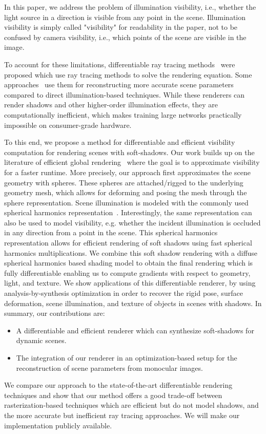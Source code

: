 %
In this paper, we address the problem of illumination visibility, i.e., whether the light source in a direction is visible from any point in the scene. 
%
Illumination visibility is simply called "visibility" for readability in the paper, not to be confused by camera visibility, i.e., which points of the scene are visible in the image.
%
%
%
\par 
%
To account for these limitations, differentiable ray tracing methods~\cite{li2018differentiable,10.1145/3355089.3356522} were proposed which use ray tracing methods to solve the rendering equation.
%
Some approaches~\cite{azinovic2019inverse} use them for reconstructing more accurate scene parameters compared to direct illumination-based techniques.
%
While these renderers can render shadows and other higher-order illumination effects, they are computationally inefficient, which makes training large networks practically impossible on consumer-grade hardware.
%
%
%
\par 
%
To this end, we propose a method for differentiable and efficient visibility computation for rendering scenes with soft-shadows.
%
Our work builds up on the literature of efficient global rendering~\cite{ren2006real,sloan2002precomputed,Guerrero08} where the goal is to approximate visibility for a faster runtime.
%
More precisely, our approach first approximates the scene geometry with spheres. 
%
These spheres are attached/rigged to the underlying geometry mesh, which allows for deforming and posing the mesh through the sphere representation.
%
Scene illumination is modeled with the commonly used spherical harmonics representation~\cite{10.1145/383259.383317}.
%
Interestingly, the same representation can also be used to model visibility, e.g. whether the incident illumination is occluded in any direction from a point in the scene.
%
This spherical harmonics representation allows for efficient rendering of soft shadows using fast spherical harmonics multiplications. 
%
We combine this soft shadow rendering with a diffuse spherical harmonics based shading model to obtain the final rendering which is fully differentiable enabling us to compute gradients with respect to geometry, light, and texture.
%
We show applications of this differentiable renderer, by using analysis-by-synthesis optimization in order to recover the rigid pose, surface deformation, scene illumination, and texture of objects in scenes with shadows.
%
%
%
In summary, our contributions are:
%
\begin{itemize}
%
\item{A differentiable and efficient renderer which can synthesize soft-shadows for dynamic scenes.}
%
\item{The integration of our renderer in an optimization-based setup for the reconstruction of scene parameters from monocular images.}
%
\end{itemize}
%
We compare our approach to the state-of-the-art differentiable rendering techniques and show that our method offers a good trade-off between rasterization-based techniques which are efficient but do not model shadows, and the more accurate but inefficient ray tracing approaches.
%
We will make our implementation publicly available.